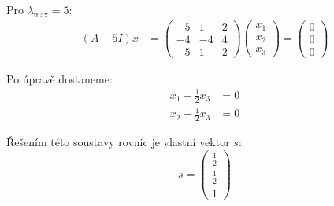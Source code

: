 \documentclass[10pt, a4paper]{ReportSheet}
\begin{document}
{        Pro $\lambda_{\max} = 5$:
        \begin{equation*}
            \begin{aligned}
                (A - 5I)x &= \begin{pmatrix}
                                 -5 & 1 & 2 \\
                                 -4 & -4 & 4 \\
                                 -5 & 1 & 2
                \end{pmatrix} \begin{pmatrix}
                                 x_1 \\
                                 x_2 \\
                                 x_3
                \end{pmatrix} = \begin{pmatrix}
                                   0 \\
                                   0 \\
                                   0
                \end{pmatrix}
            \end{aligned}
        \end{equation*}

        Po úpravě dostaneme:
        \begin{equation*}
            \begin{aligned}
                x_1 - \frac{1}{2}x_3 &= 0 \\
                x_2 - \frac{1}{2}x_3 &= 0
            \end{aligned}
        \end{equation*}

        Řešením této soustavy rovnic je vlastní vektor $s$:
        \begin{equation*}
            s = \begin{pmatrix}
                    \frac{1}{2} \\
                    \frac{1}{2} \\
                    1
            \end{pmatrix}
        \end{equation*}

    }
\end{document}
